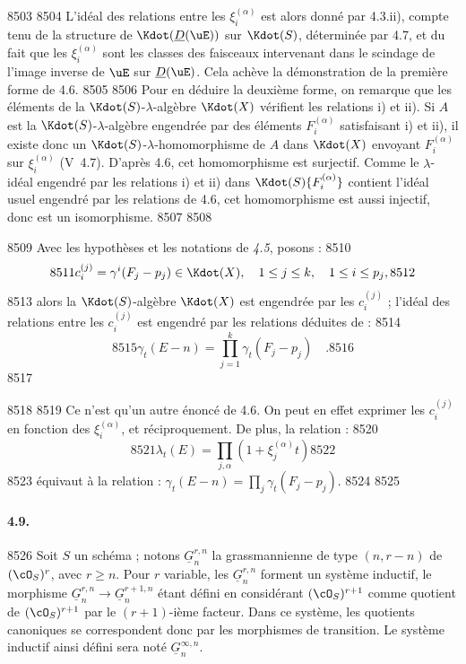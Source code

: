   8503	
  8504	L'id\'eal des relations entre les $\xi_i^{(\alpha)}$ est alors donn\'e par 4.3.ii), compte tenu de la structure de $\Kdot(\underline{D}(\uE))$ sur $\Kdot(S)$, d\'etermin\'ee par 4.7, et du fait que les $\xi_i^{(\alpha)}$ sont les classes des faisceaux intervenant dans le scindage de l'image inverse de $\uE$ sur $\underline{D}(\uE)$. Cela ach\`eve la d\'emonstration de la premi\`ere forme de 4.6.
  8505	
  8506	Pour en d\'eduire la deuxi\`eme forme, on remarque que les \'el\'ements de la $\Kdot(S)$-$\lambda$-alg\`ebre $\Kdot(X)$ v\'erifient les relations i) et ii). Si $A$ est la $\Kdot(S)$-$\lambda$-alg\`ebre engendr\'ee par des \'el\'ements $F_i^{(\alpha)}$ satisfaisant i) et ii), il existe donc un $\Kdot(S)$-$\lambda$-homomorphisme de $A$ dans $\Kdot(X)$ envoyant $F_i^{(\alpha)}$ sur $\xi_i^{(\alpha)}$ (V~4.7). D'apr\`es 4.6, cet homomorphisme est surjectif. Comme le $\lambda$-id\'eal engendr\'e par les relations i) et ii) dans $\Kdot(S)\{F_i^{(\alpha)}\}$ contient l'id\'eal usuel engendr\'e par les relations de 4.6, cet homomorphisme est aussi injectif, donc est un isomorphisme.
  8507	
  8508	\begin{corollaire}[4.8]
  8509	Avec les hypoth\`eses et les notations de \emph{4.5}, posons :
  8510	\[
  8511	c_i^{(j)} = \gamma^{i}(F_j - p_j) \in \Kdot(X), \quad 1 \leq j \leq k, \quad 1 \leq i \leq p_j,
  8512	\]
  8513	alors la $\Kdot(S)$-alg\`ebre $\Kdot(X)$ est engendr\'ee par les $c_i^{(j)}$ ; l'id\'eal des relations entre les $c_i^{(j)}$ est engendr\'e par les relations d\'eduites de :
  8514	\[
  8515	\gamma_t(E - n) = \prod_{j=1}^{k} \gamma_t(F_j - p_j) \quad .
  8516	\]
  8517	\end{corollaire}
  8518	
  8519	Ce n'est qu'un autre \'enonc\'e de 4.6. On peut en effet exprimer les $c_i^{(j)}$ en fonction des $\xi_i^{(\alpha)}$, et r\'eciproquement. De plus, la relation :
  8520	\[
  8521	\lambda_t(E) = \prod_{j,\alpha} (1 + \xi_j^{(\alpha)} t)
  8522	\]
  8523	\'equivaut \`a la relation : $\gamma_t(E-n) = \prod_j \gamma_t(F_j - p_j)$.
  8524	
  8525	\paragraph{4.9.}
  8526	Soit $S$ un sch\'ema ; notons $\underline{G}_n^{r,n}$ la grassmannienne de type $(n,r-n)$ de $(\cO_S)^r$, avec $r \geq n$. Pour $r$ variable, les $\underline{G}_n^{r,n}$ forment un syst\`eme inductif, le morphisme $\underline{G}_n^{r,n} \to \underline{G}_n^{r+1,n}$ \'etant d\'efini en consid\'erant $(\cO_S)^{r+1}$ comme quotient de $(\cO_S)^{r+1}$ par le $(r+1)$-i\`eme facteur. Dans ce syst\`eme, les quotients canoniques se correspondent donc par les morphismes de transition. Le syst\`eme inductif ainsi d\'efini sera not\'e $\underline{G}_n^{\infty,n}$.
